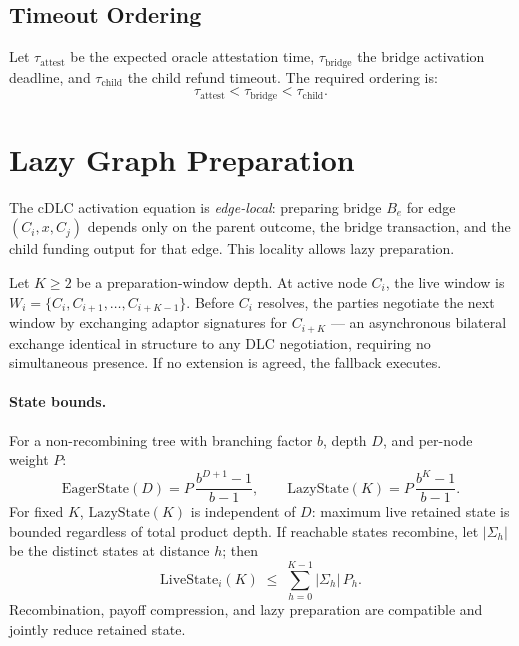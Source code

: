 \documentclass[11pt,a4paper]{article}
\theoremstyle{claimstyle}
\begin{document}
\subsection{Timeout Ordering}

Let $\tau_{\mathrm{attest}}$ be the expected oracle attestation time,
$\tau_{\mathrm{bridge}}$ the bridge activation deadline, and
$\tau_{\mathrm{child}}$ the child refund timeout. The required ordering is:
\[
  \tau_{\mathrm{attest}} < \tau_{\mathrm{bridge}} < \tau_{\mathrm{child}}.
\]

\section{Lazy Graph Preparation}

\label{sec:lazy}

The cDLC activation equation is \emph{edge-local}: preparing bridge $B_e$ for
edge $(C_i, x, C_j)$ depends only on the parent outcome, the bridge transaction,
and the child funding output for that edge. This locality allows lazy
preparation.

Let $K \geq 2$ be a preparation-window depth. At active node $C_i$, the live
window is $W_i = \{C_i, C_{i+1}, \ldots, C_{i+K-1}\}$. Before $C_i$ resolves,
the parties negotiate the next window by exchanging adaptor signatures for
$C_{i+K}$ --- an asynchronous bilateral exchange identical in structure to any
DLC negotiation, requiring no simultaneous presence. If no extension is agreed,
the fallback executes.

\paragraph{State bounds.}
For a non-recombining tree with branching factor $b$, depth $D$, and per-node
weight $P$:
\[
  \mathrm{EagerState}(D) = P\,\frac{b^{D+1}-1}{b-1},\qquad
  \mathrm{LazyState}(K)  = P\,\frac{b^{K}-1}{b-1}.
\]
For fixed $K$, $\mathrm{LazyState}(K)$ is independent of $D$: maximum live
retained state is bounded regardless of total product depth. If reachable states
recombine, let $|\Sigma_h|$ be the distinct states at distance $h$; then
\[
  \mathrm{LiveState}_i(K) \;\leq\; \sum_{h=0}^{K-1}|\Sigma_h|\,P_h.
\]
Recombination, payoff compression, and lazy preparation are compatible and
jointly reduce retained state.

\end{document}

